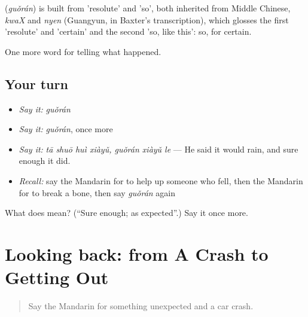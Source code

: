 \begin{cousinweb}
\textbf{} (\emph{guǒrán}) is built from  'resolute' and  'so', both inherited from Middle Chinese, \emph{kwaX} and \emph{nyen} (Guangyun, in Baxter's transcription), which glosses the first 'resolute' and 'certain' and the second 'so, like this': so, for certain.
\end{cousinweb}

\begin{grammarlens}[title={What you've built}]
One more word for telling what happened.
\end{grammarlens}

\subsection*{Your turn}
\begin{itemize}
\raggedright
  \item \emph{Say it:} \emph{guǒrán}
  \item \emph{Say it:} \emph{guǒrán}, once more
  \item \emph{Say it:} \emph{tā shuō huì xiàyǔ, guǒrán xiàyǔ le} — He said it would rain, and sure enough it did.
  \item \emph{Recall:} say the Mandarin for to help up someone who fell, then the Mandarin for to break a bone, then say \emph{guǒrán} again
\end{itemize}

\begin{tcolorbox}[breakable,colback=teal!4,colframe=teal!35!black,title={Before you move on}]
What does  mean? (\textquotedblleft{}Sure enough; as expected\textquotedblright{}.) Say it once more.
\end{tcolorbox}
\section[(dialogue)]{Looking back: from A Crash to Getting Out}

\label{lesson:ZH-R301-review-296-301}



\begin{quote}
Say the Mandarin for something unexpected and a car crash.
\end{quote}


